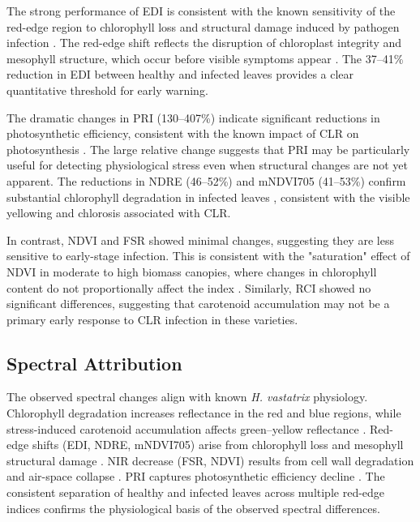 \documentclass[conference]{IEEEtran}
\begin{document}
The strong performance of EDI is consistent with the known sensitivity of the red-edge region to chlorophyll loss and structural damage induced by pathogen infection \cite{oliveira2022,gamon1992}. The red-edge shift reflects the disruption of chloroplast integrity and mesophyll structure, which occur before visible symptoms appear \cite{kushalappa1983}. The 37--41\% reduction in EDI between healthy and infected leaves provides a clear quantitative threshold for early warning.

The dramatic changes in PRI (130--407\%) indicate significant reductions in photosynthetic efficiency, consistent with the known impact of CLR on photosynthesis \cite{gamon1992}. The large relative change suggests that PRI may be particularly useful for detecting physiological stress even when structural changes are not yet apparent. The reductions in NDRE (46--52\%) and mNDVI705 (41--53\%) confirm substantial chlorophyll degradation in infected leaves \cite{gitelson2003}, consistent with the visible yellowing and chlorosis associated with CLR.

In contrast, NDVI and FSR showed minimal changes, suggesting they are less sensitive to early-stage infection. This is consistent with the "saturation" effect of NDVI in moderate to high biomass canopies, where changes in chlorophyll content do not proportionally affect the index \cite{rouse1973}. Similarly, RCI showed no significant differences, suggesting that carotenoid accumulation may not be a primary early response to CLR infection in these varieties.


\subsection{Spectral Attribution}
The observed spectral changes align with known \textit{H. vastatrix} physiology. Chlorophyll degradation increases reflectance in the red and blue regions, while stress-induced carotenoid accumulation affects green--yellow reflectance \cite{gitelson2002,oliveira2022,talhinhas2017}. Red-edge shifts (EDI, NDRE, mNDVI705) arise from chlorophyll loss and mesophyll structural damage \cite{oliveira2022,gamon1992,gitelson2003}. NIR decrease (FSR, NDVI) results from cell wall degradation and air-space collapse \cite{oliveira2022,marin2021}. PRI captures photosynthetic efficiency decline \cite{gamon1992}. The consistent separation of healthy and infected leaves across multiple red-edge indices confirms the physiological basis of the observed spectral differences.
\end{document}
